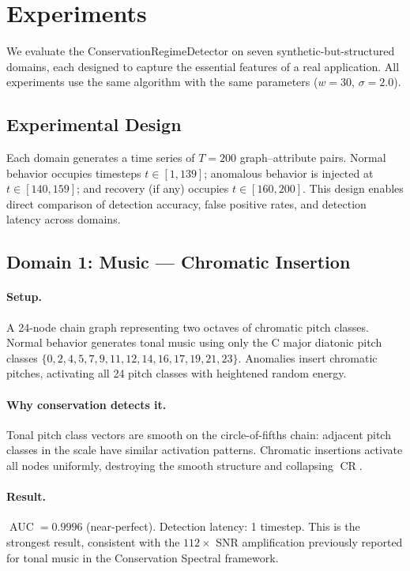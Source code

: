\documentclass[11pt,a4paper]{article}
\DeclareMathOperator{\CR}{CR}
\DeclareMathOperator{\AUC}{AUC}
\begin{document}
\section{Experiments}\label{sec:experiments}

We evaluate the ConservationRegimeDetector on seven synthetic-but-structured
domains, each designed to capture the essential features of a real application.
All experiments use the same algorithm with the same parameters ($w=30$,
$\sigma=2.0$).

\subsection{Experimental Design}

Each domain generates a time series of $T = 200$ graph--attribute pairs.
Normal behavior occupies timesteps $t \in [1, 139]$; anomalous behavior is
injected at $t \in [140, 159]$; and recovery (if any) occupies
$t \in [160, 200]$.  This design enables direct comparison of detection
accuracy, false positive rates, and detection latency across domains.

\subsection{Domain 1: Music --- Chromatic Insertion}

\paragraph{Setup.} A 24-node chain graph representing two octaves of chromatic
pitch classes.  Normal behavior generates tonal music using only the C major
diatonic pitch classes $\{0, 2, 4, 5, 7, 9, 11, 12, 14, 16, 17, 19, 21, 23\}$.
Anomalies insert chromatic pitches, activating all 24 pitch classes with
heightened random energy.

\paragraph{Why conservation detects it.} Tonal pitch class vectors are smooth
on the circle-of-fifths chain: adjacent pitch classes in the scale have similar
activation patterns.  Chromatic insertions activate all nodes uniformly, destroying
the smooth structure and collapsing $\CR$.

\paragraph{Result.} $\AUC = 0.9996$ (near-perfect).  Detection latency: 1
timestep.  This is the strongest result, consistent with the $112\times$
SNR amplification previously reported for tonal music in the Conservation
Spectral framework.
\end{document}
